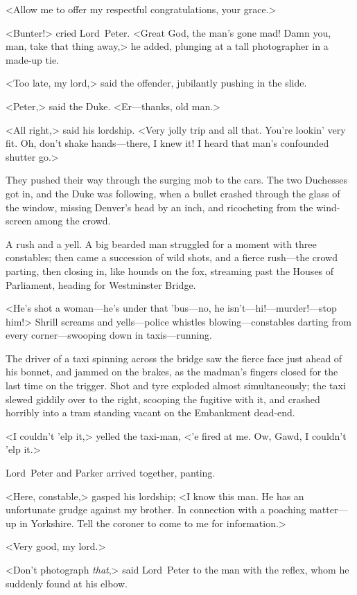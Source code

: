 <Allow me to offer my respectful congratulations, your grace.>

<Bunter!> cried Lord~Peter. <Great God, the man's gone mad! Damn you, man, take that thing away,> he added, plunging at a tall photographer in a made-up tie.

<Too late, my lord,> said the offender, jubilantly pushing in the slide.

<Peter,> said the Duke. <Er—thanks, old man.>

<All right,> said his lordship. <Very jolly trip and all that. You're lookin' very fit. Oh, don't shake hands—there, I knew it! I heard that man's confounded shutter go.>

They pushed their way through the surging mob to the cars. The two Duchesses got in, and the Duke was following, when a bullet crashed through the glass of the window, missing Denver's head by an inch, and ricocheting from the wind-screen among the crowd.

A rush and a yell. A big bearded man struggled for a moment with three constables; then came a succession of wild shots, and a fierce rush—the crowd parting, then closing in, like hounds on the fox, streaming past the Houses of Parliament, heading for Westminster Bridge.

<He's shot a woman—he's under that 'bus—no, he isn't—hi!—murder!\allowbreak—stop him!> Shrill screams and yells—police whistles blowing—constables darting from every corner—swooping down in taxis—running.

The driver of a taxi spinning across the bridge saw the fierce face just ahead of his bonnet, and jammed on the brakes, as the madman's fingers closed for the last time on the trigger. Shot and tyre exploded almost simultaneously; the taxi slewed giddily over to the right, scooping the fugitive with it, and crashed horribly into a tram standing vacant on the Embankment dead-end.

<I couldn't 'elp it,> yelled the taxi-man, <'e fired at me. Ow, Gawd, I couldn't 'elp it.>

Lord~Peter and Parker arrived together, panting.

<Here, constable,> gasped his lordship; <I know this man. He has an unfortunate grudge against my brother. In connection with a poaching matter—up in Yorkshire. Tell the coroner to come to me for information.>

<Very good, my lord.>

<Don't photograph \textit{that},> said Lord~Peter to the man with the reflex, whom he suddenly found at his elbow.

